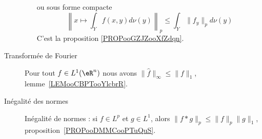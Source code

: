 \begin{description}
\begin{enumerate}
\begin{equation*}
		            \end{equation*}
		            ou sous forme compacte
		            \begin{equation*}
			            \left\|   x\mapsto\int_Y f(x,y)d\nu(y)   \right\|_p\leq \int_Y  \| f_y \|_pd\nu(y)
		            \end{equation*}
		            C'est la proposition \ref{PROPooGZJZooXfZdqn}.
	      \end{enumerate}
	\item[Transformée de Fourier]
	      Pour tout \( f\in L^1(\eR^n)\) nous avons \( \| \hat f \|_{\infty}\leq \| f \|_1\), lemme~\ref{LEMooCBPTooYlcbrR}.
	\item[Inégalité des normes]
	      Inégalité de normes : si \( f\in L^p\) et \( g\in L^1\), alors \( \| f*g \|_p\leq \| f \|_p\| g \|_1\), proposition~\ref{PROPooDMMCooPTuQuS}.

\end{description}

